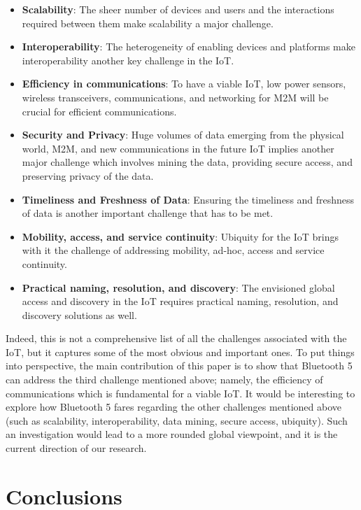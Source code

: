 \documentclass[12pt, draftclsnofoot, onecolumn]{IEEEtran}
\begin{document}
\begin{itemize}
	\item \textbf{Scalability}: The sheer number of devices and users and the interactions required between them make scalability a major challenge.
	\item \textbf{Interoperability}: The heterogeneity of enabling devices and platforms make interoperability another key challenge in the IoT.
	\item \textbf{Efficiency in communications}: To have a viable IoT, low power sensors, wireless transceivers, communications, and networking for M2M will be crucial for efficient communications.
	\item \textbf{Security and Privacy}: Huge volumes of data emerging from the physical world, M2M, and new communications in the future IoT implies another major challenge which involves mining the data, providing secure access, and preserving privacy of the data.
	\item \textbf{Timeliness and Freshness of Data}: Ensuring the timeliness and freshness of data is another important challenge that has to be met.
	\item \textbf{Mobility, access, and service continuity}: Ubiquity for the IoT brings with it the challenge of addressing mobility, ad-hoc, access and service continuity.
	\item \textbf{Practical naming, resolution, and discovery}: The envisioned global access and discovery in the IoT requires practical naming, resolution, and discovery solutions as well.
\end{itemize}

Indeed, this is not a comprehensive list of all the challenges associated with the IoT, but it captures some of the most obvious and important ones. To put things into perspective, the main contribution of this paper is to show that Bluetooth 5 can address the third challenge mentioned above; namely, the efficiency of communications which is fundamental for a viable IoT. It would be interesting to explore how Bluetooth 5 fares regarding the other challenges mentioned above (such as scalability, interoperability, data mining, secure access, ubiquity). Such an investigation would lead to a more rounded global viewpoint, and it is the current direction of our research.

\section{Conclusions}
\label{sec:conclusions}
\end{document}

